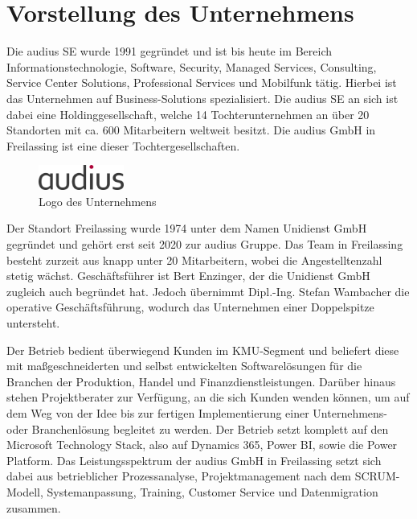 \section{Vorstellung des Unternehmens}
\label{sec:vorstellungunternehmen}

Die audius SE wurde 1991 gegründet und ist bis heute im Bereich Informationstechnologie, Software, Security, Managed Services, Consulting, Service Center Solutions, Professional Services und Mobilfunk tätig. Hierbei ist das Unternehmen auf Business-Solutions spezialisiert. Die audius SE an sich ist dabei eine Holdinggesellschaft, welche 14 Tochterunternehmen an über 20 Standorten mit ca. 600 Mitarbeitern weltweit besitzt. Die audius GmbH in Freilassing ist eine dieser Tochtergesellschaften.

\begin{figure}[h]
    \centering
    \includegraphics[width=0.25\textwidth]{img/audius_logo.png}
    \caption{Logo des Unternehmens}
\end{figure}

Der Standort Freilassing wurde 1974 unter dem Namen Unidienst GmbH gegründet und gehört erst seit 2020 zur audius Gruppe. Das Team in Freilassing besteht zurzeit aus knapp unter 20 Mitarbeitern, wobei die Angestelltenzahl stetig wächst. Geschäftsführer ist Bert Enzinger, der die Unidienst GmbH zugleich auch begründet hat. Jedoch übernimmt Dipl.-Ing. Stefan Wambacher die operative Geschäftsführung, wodurch das Unternehmen einer Doppelspitze untersteht.

Der Betrieb bedient überwiegend Kunden im KMU-Segment und beliefert diese mit maßgeschneiderten und selbst entwickelten Softwarelösungen für die Branchen der Produktion, Handel und Finanzdienstleistungen. Darüber hinaus stehen Projektberater zur Verfügung, an die sich Kunden wenden können, um auf dem Weg von der Idee bis zur fertigen Implementierung einer Unternehmens- oder Branchenlösung begleitet zu werden. Der Betrieb setzt komplett auf den Microsoft Technology Stack, also auf Dynamics 365, Power BI, sowie die Power Platform. Das Leistungsspektrum der audius GmbH in Freilassing setzt sich dabei aus betrieblicher Prozessanalyse, Projektmanagement nach dem SCRUM-Modell, Systemanpassung, Training, Customer Service und Datenmigration zusammen.